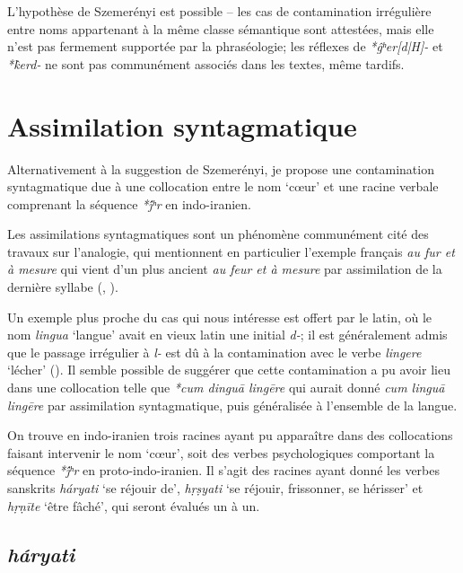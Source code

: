 \documentclass{article}
\newcommand{\ipa}[1]{{\phon\textit{#1}}}
\begin{document}
L'hypothèse de Szemerényi est possible -- les cas de contamination irrégulière entre noms appartenant à la même classe sémantique sont attestées, mais elle n'est pas fermement supportée par la phraséologie; les réflexes de \ipa{*ĝʰer[d|H]-} et \ipa{*k̂erd-} ne sont pas communément associés dans les textes, même tardifs.

\section{Assimilation syntagmatique}
Alternativement à la suggestion de Szemerényi, je propose une contamination syntagmatique due à une collocation entre le nom `cœur' et une racine verbale comprenant la séquence \ipa{*j́ʰr} en indo-iranien. 

Les assimilations syntagmatiques sont un phénomène communément cité des travaux sur l'analogie, qui mentionnent en particulier l'exemple français \ipa{au fur et à mesure} qui vient d'un plus ancient \ipa{au feur et à mesure} par assimilation de la dernière syllabe (\citealt[16]{andersen80morpho}, \citealt[64]{fertig13analogy}). %

Un exemple plus proche du cas qui nous intéresse est offert par le latin, où le nom \ipa{lingua} `langue' avait en vieux latin une initial \ipa{d-}; il est généralement admis que le passage irrégulier à \ipa{l-} est dû à la contamination avec le verbe \ipa{lingere} `lécher' (\citealt[304]{hock91principles}). Il semble possible de suggérer que cette contamination a pu avoir lieu dans une collocation telle que \ipa{*cum dinguā lingēre} qui aurait donné \ipa{cum linguā lingēre} par assimilation syntagmatique, puis généralisée à l'ensemble de la langue.
 
On trouve en indo-iranien trois racines ayant pu apparaître dans des collocations faisant intervenir le nom `cœur', soit des verbes psychologiques comportant la séquence \ipa{*j́ʰr} en proto-indo-iranien. Il s'agit des racines ayant donné les verbes sanskrits \ipa{háryati} `se réjouir de', \ipa{hṛṣyati} `se réjouir, frissonner, se hérisser' et \ipa{hṛṇīte} `être fâché', qui seront évalués un à un.

\subsection{\ipa{háryati}} \label{sec:haryati}
\end{document}
